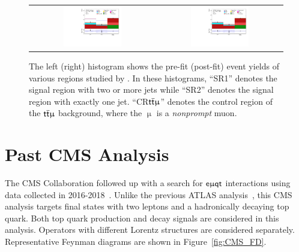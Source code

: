 \begin{figure}[tbh!]
 \begin{center}
 \begin{tabular}{cc}
 \includegraphics[width=0.48\textwidth]{figures/Part3/History/ATLAS_results3}&
 \includegraphics[width=0.48\textwidth]{figures/Part3/History/ATLAS_results4}\\
 \end{tabular}
 \caption{The left (right) histogram shows the pre-fit (post-fit) event yields of various regions studied by \cite{ATLAS-CONF-2023-001}. In these histograms, ``SR1'' denotes the signal region with two or more jets while ``SR2'' denotes the signal region with exactly one jet. ``CR$\textsf{t}\overline{\textsf{t}}\upmu$'' denotes the control region of the $\textsf{t}\overline{\textsf{t}}\upmu$ background, where the $\upmu$ is a \emph{nonprompt} muon.}
 \label{fig:ATLAS_results2}
 \end{center}
\end{figure}
\section{Past CMS Analysis}
\label{sec:CLFV_CMS}

The \ac{CMS} Collaboration followed up with a search for $\textsf{e}\upmu\textsf{{q}t}$ interactions using data collected in 2016-2018~\cite{CMS:2022ztx}. Unlike the previous \ac{ATLAS} analysis~\cite{ATLAS-CONF-2018-044}, this \ac{CMS} analysis targets final states with two leptons and a hadronically decaying top quark. Both top quark production and decay signals are considered in this analysis. Operators with different Lorentz structures are considered separately. Representative Feynman diagrams are shown in Figure~\ref{fig:CMS_FD}. 

